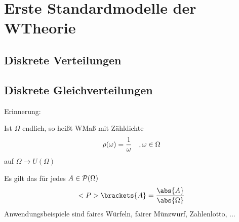 \chapter{Erste Standardmodelle der WTheorie} %

\section*{Diskrete Verteilungen}

\section{Diskrete Gleichverteilungen}


Erinnerung:
\begin{*erinnerung}[\propref{1_10}]
	Ist $\Omega$ endlich, so heißt WMaß mit Zähldichte
	\begin{align}
		\rho(\omega) = \frac{1}{\omega}\quad, \omega \in \Omega\notag
	\end{align}
	 auf $\Omega \to U(\Omega)$
\end{*erinnerung}


Es gilt das für jedes $A \in \mathcal{P}(\Omega)$
\begin{align}
	\probp\brackets{A} = \frac{\abs{A}}{\abs{\Omega}} \notag
\end{align}
Anwendungsbeispiele sind faires Würfeln, fairer Münzwurf, Zahlenlotto, ...


